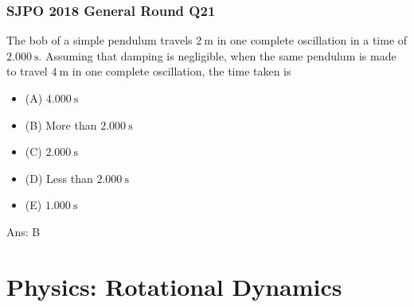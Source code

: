 \documentclass{article}
\begin{document}
\begin{samepage}
\subsubsection{SJPO 2018 General Round Q21}
The bob of a simple pendulum travels $2 \mathrm{~m}$ in one complete oscillation in a time of $2.000 \mathrm{~s}$. Assuming that damping is negligible, when the same pendulum is made to travel $4 \mathrm{~m}$ in one complete oscillation, the time taken is
\begin{itemize}
\item[](A) $4.000 \mathrm{~s}$
\item[](B) More than $2.000 \mathrm{~s}$
\item[](C) $2.000 \mathrm{~s}$
\item[](D) Less than $2.000 \mathrm{~s}$
\item[](E) $1.000 \mathrm{~s}$
\end{itemize}
Ans: \ifpaper B \fi 
\end{samepage}

\newpage \clearpage
\section{Physics: Rotational Dynamics}
\end{document}

